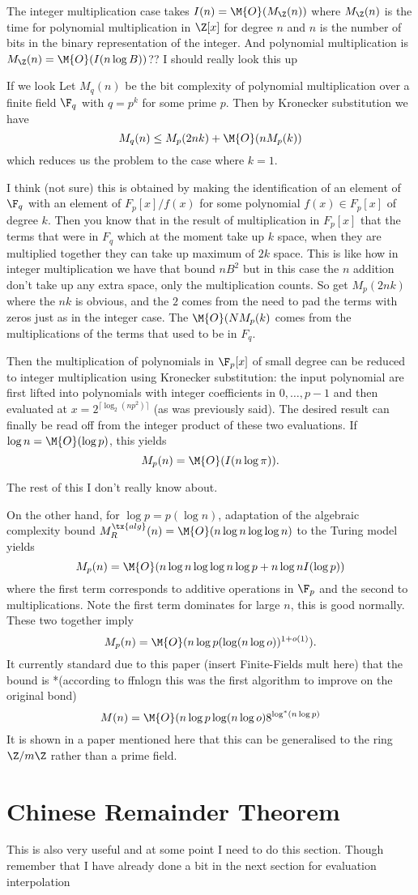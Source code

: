 The integer multiplication case takes $I(n) = \M{O}(M_\Z(n))$ where $M_\Z(n)$ is the time for polynomial multiplication in $\Z[x]$ for degree $n$ and $n$ is the number of bits in the binary representation of the integer. And polynomial multiplication is $M_\Z(n) = \M{O}(I(n\log B))$?? I should really look this up

If we look 
Let $M_q(n)$ be the bit complexity of polynomial multiplication over a finite field $\F_q$ with $q = p^k$ for some prime $p$. Then by Kronecker substitution we have
\[
    M_q(n) \leq M_p(2nk) + \M{O}(n M_p(k))
\]
which reduces us the problem to the case where $k = 1$.

I think (not sure) this is obtained by making the identification of an element of $\F_q$ with an element of $F_p[x]/f(x)$ for some polynomial $f(x) \in F_p[x]$ of degree $k$. Then you know that in the result of multiplication in $F_p[x]$ that the terms that were in $F_q$ which at the moment take up $k$ space, when they are multiplied together they can take up  maximum of $2k$ space. This is like how in integer multiplication we have that bound $nB^2$ but in this case the $n$ addition don't take up any extra space, only the multiplication counts. So get $M_p(2nk)$ where the $nk$ is obvious, and the $2$ comes from the need to pad the terms with zeros just as in the integer case. The $\M{O}(N M_p(k)$ comes from the multiplications of the terms that used to be in $F_q$.

Then the multiplication of polynomials in $\F_p[x]$ of small degree can be reduced to integer multiplication using Kronecker substitution: the input polynomial are first lifted into polynomials with integer coefficients in $0, \ldots, p - 1$ and then evaluated at $x = 2^{\lceil \log_2(n p^2) \rceil}$ (as was previously said). The desired result can finally be read off from the integer product of these two evaluations. If $\log n = \M{O}(\log p)$, this yields
\[
    M_p(n) = \M{O}(I(n \log \pi)).
\]

The rest of this I don't really know about.

On the other hand, for $\log p = p(\log n)$, adaptation of the algebraic complexity bound $M_R^\tx{alg}(n) = \M{O}(n \log n \log \log n)$ to the Turing model yields
\[
    M_p(n) = \M{O}(n \log n \log \log n \log p + n \log n I(\log p))
\]
where the first term corresponds to additive operations in $\F_p$ and the second to multiplications. Note the first term dominates for large $n$, this is good normally. These two together imply 
\[
    M_p(n) = \M{O}(n \log p (\log (n \log o))^{1 + o(1)}).
\]
It currently standard due to this paper (insert Finite-Fields mult here) that the bound is *(according to ffnlogn  this was the first algorithm to improve on the original bond)
\[
    M(n) = \M{O}(n \log p \log (n \log o) 8^{\log^\ast(n \log p)}
\]
It is shown in a paper mentioned here that this can be generalised to the ring $\Z / m\Z$ rather than a prime field.

\section{Chinese Remainder Theorem}%
\label{sec:crt}

This is also very useful and at some point I need to do this section. Though remember that I have already done a bit in the next section for evaluation interpolation

